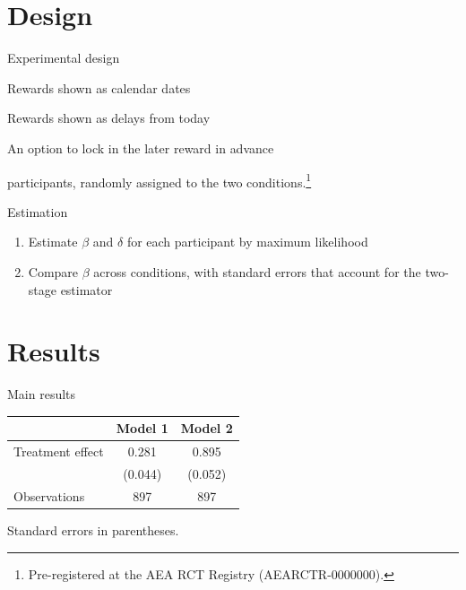 \documentclass[
    aspectratio=169,11pt,t,
]{beamer}
\begin{document}
\section{Design}

\begin{frame}{Experimental design}
  \begin{description}[Commitment]
    \item[Control] Rewards shown as calendar dates
    \item[Treatment] Rewards shown as delays from today
    \item[Commitment] An option to lock in the later reward in advance
  \end{description}
   participants, randomly assigned to the two
  conditions.\footnote{Pre-registered at the AEA RCT Registry
  (AEARCTR-0000000).}
\end{frame}

\begin{frame}{Estimation}
  \begin{enumerate}
    \item Estimate $\beta$ and $\delta$ for each participant by maximum
    likelihood
    \item Compare $\beta$ across conditions, with standard errors that
    account for the two-stage estimator
  \end{enumerate}
\end{frame}

\section{Results}

\begin{frame}[label=results]{Main results}
  \centering
  \begin{tabular}{lcc}
    \toprule
                     & Model 1          & Model 2 \\
    \midrule
    Treatment effect & \alert<2>{0.281} & 0.895   \\
                     & (0.044)          & (0.052) \\
    \midrule
    Observations     & 897              & 897     \\
    \bottomrule
  \end{tabular}

  \medskip
  {\footnotesize Standard errors in parentheses.}

  \bigskip

  \vfill
  \hfill\hyperlink{robustness}{}
\end{frame}
\end{document}
